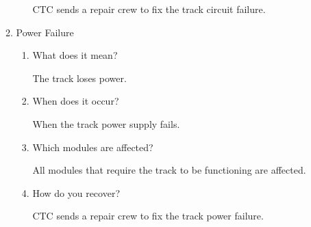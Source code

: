 \documentclass[11pt]{article}
\begin{document}
\begin{enumerate}
\begin{enumerate}
\begin{enumerate}
CTC sends a repair crew to fix the track circuit failure.
\end{enumerate}
\item Power Failure
\label{sec-3-1-3-10-3}
\begin{enumerate}
\item What does it mean?
\label{sec-3-1-3-10-3-1}

The track loses power.
\item When does it occur?
\label{sec-3-1-3-10-3-2}

When the track power supply fails.
\item Which modules are affected?
\label{sec-3-1-3-10-3-3}

All modules that require the track to be functioning are affected.
\item How do you recover?
\label{sec-3-1-3-10-3-4}

CTC sends a repair crew to fix the track power failure.
\end{enumerate}
\end{enumerate}
\end{enumerate}
\end{document}
